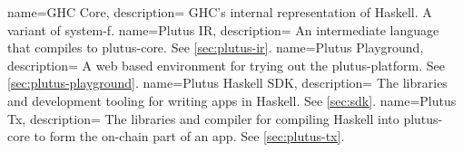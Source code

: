 {
  name=GHC Core,
  description={
    GHC's internal representation of Haskell.
    A variant of \gls{system-f}.
  }
}
{
  name=Plutus IR,
  description={
    An intermediate language that compiles to \gls{plutus-core}.
    See \cref{sec:plutus-ir}.
  }
}
{
  name=Plutus Playground,
  description={
    A web based environment for trying out the \gls{plutus-platform}.
    See \cref{sec:plutus-playground}.
  }
}
{
  name=Plutus Haskell SDK,
  description={
    The libraries and development tooling for writing \glspl{app} in Haskell.
    See \cref{sec:sdk}.
  }
}
{
  name=Plutus Tx,
  description={
    The libraries and compiler for compiling Haskell into \gls{plutus-core} to form the on-chain part of an \gls{app}.
    See \cref{sec:plutus-tx}.
  }
}
